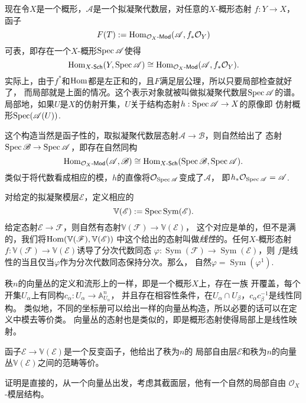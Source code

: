 现在令$X$是一个概形，$\mathscr A$是一个拟凝聚代数层，对任意的$X$-概形态射
$f:Y\to X$，函子
\[
    F(T):=\operatorname{Hom}_{\mathcal{O}_X\text{-}\mathsf{Mod}}(\mathscr A,f_*\mathcal{O}_Y)
\]
可表，即存在一个$X$-概形$\operatorname{Spec} \mathscr A$使得
\[
    \operatorname{Hom}_{X\text{-}\mathsf{Sch}}(Y,\operatorname{Spec} \mathscr A)\cong
    \operatorname{Hom}_{\mathcal{O}_X\text{-}\mathsf{Mod}}(\mathscr A,f_*\mathcal{O}_Y).
\]
实际上，由于$f^*$和$\operatorname{Hom}$都是左正和的，且$F$满足层公理，所以只要局部检查就好了，
而局部就是上面的情况。这个表示对象就被叫做拟凝聚代数层$\operatorname{Spec} \mathscr A$的谱。
局部地，如果$U$是$X$的仿射开集，$U$关于结构态射$h:\operatorname{Spec}\mathscr A\to X$的原像即
仿射概形$\operatorname{Spec}(\mathscr A(U))$. 

这个构造当然是函子性的，取拟凝聚代数层态射$\mathscr A\to \mathscr B$，则自然给出了
态射$\operatorname{Spec} \mathscr B\to \operatorname{Spec} \mathscr A$，即存在自然同构
\[
    \operatorname{Hom}_{\mathcal{O}_X\text{-}\mathsf{Mod}}(\mathscr A,\mathscr B)\cong
    \operatorname{Hom}_{X\text{-}\mathsf{Sch}}(\operatorname{Spec} \mathscr B,\operatorname{Spec} \mathscr A).
\]
类似于将代数看成相应的模，$h$的直像将$\mathcal O_{\operatorname{Spec} \mathscr A}$变成了$\mathscr A$，
即$h_*\mathcal O_{\operatorname{Spec} \mathscr A}=\mathscr A$.

\para 对给定的拟凝聚模层$\mathscr E$，定义相应的
\[
    \mathbb V(\mathscr E):=\operatorname{Spec} \operatorname{Sym}(\mathscr E).
\]
给定态射$\mathscr E\to \mathscr F$，则自然有态射$\mathbb V(\mathscr F)\to \mathbb V(\mathscr E)$，
这个对应是单的，但不是满的，我们将$\operatorname{Hom}(\mathbb V(\mathscr F),\mathbb V(\mathscr E))$
中这个给出的态射叫做\textit{线性}的。任何$X$-概形态射
$f:\mathbb V(\mathscr F)\to \mathbb V(\mathscr E)$诱导了分次代数同态
$\varphi:\operatorname{Sym}(\mathscr F)\to \operatorname{Sym}(\mathscr E)$，则
$f$是线性的当且仅当$\varphi$作为分次代数同态保持分次。那么，
自然$\varphi=\operatorname{Sym}(\varphi^1)$.

\para[向量丛] 秩$n$的向量丛的定义和流形上的一样，即是一个概形$X$上，存在一族
开覆盖，每个开集$U_\alpha$上有同构$c_\alpha:U_\alpha\to \mathbb A_{U_\alpha}^n$，
并且存在相容性条件，在$U_\alpha\cap U_\beta$，$c_\alpha c_\beta^{-1}$是线性同构。
类似地，不同的坐标册可以给出一样的向量丛构造，所以必要的话可以在定义中模去等价类。
向量丛的态射也是类似的，即是概形态射使得局部上是线性映射。


\begin{pro}
函子$\mathscr E\to \mathbb V(\mathscr E)$是一个反变函子，他给出了秩为$n$的
局部自由层$\mathscr E$和秩为$n$的向量丛$\mathbb V(\mathscr E)$之间的范畴等价。
\end{pro}

证明是直接的，从一个向量丛出发，考虑其截面层，他有一个自然的局部自由
$\mathscr O_X$-模层结构。